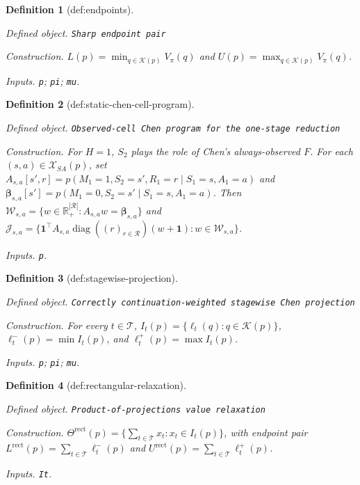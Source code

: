 \documentclass{article}
\newtheorem{definition}{Definition}
\begin{document}
\begin{definition}[def:endpoints]\label{def:endpoints}
\par\smallskip\noindent\emph{Defined object.} \texttt{Sharp endpoint pair}
\par\smallskip\noindent\emph{Construction.} \(L(p)=\min_{q\in\mathcal K(p)}V_\pi(q)\) and \(U(p)=\max_{q\in\mathcal K(p)}V_\pi(q)\).
\par\smallskip\noindent\emph{Inputs.} \texttt{p}; \texttt{pi}; \texttt{mu}.
\end{definition}

\begin{definition}[def:static-chen-cell-program]\label{def:static-chen-cell-program}
\par\smallskip\noindent\emph{Defined object.} \texttt{Observed-\allowbreak{}cell Chen program for the one-\allowbreak{}stage reduction}
\par\smallskip\noindent\emph{Construction.} For \(H=1\), \(S_2\) plays the role of Chen's always-observed \(F\). For each \((s,a)\in\mathcal X_{SA}(p)\), set \(A_{s,a}[s',r]=p(M_1=1,S_2=s',R_1=r\mid S_1=s,A_1=a)\) and \(\boldsymbol\beta_{s,a}[s']=p(M_1=0,S_2=s'\mid S_1=s,A_1=a)\). Then \(\mathcal W_{s,a}=\{w\in\mathbb R_+^{|\mathcal R|}:A_{s,a}w=\boldsymbol\beta_{s,a}\}\) and \(\mathcal J_{s,a}=\{\mathbf 1^\top A_{s,a}\operatorname{diag}((r)_{r\in\mathcal R})(w+\mathbf 1):w\in\mathcal W_{s,a}\}\).
\par\smallskip\noindent\emph{Inputs.} \texttt{p}.
\end{definition}

\begin{definition}[def:stagewise-projection]\label{def:stagewise-projection}
\par\smallskip\noindent\emph{Defined object.} \texttt{Correctly continuation-\allowbreak{}weighted stagewise Chen projection}
\par\smallskip\noindent\emph{Construction.} For every \(t\in\mathcal T\), \(I_t(p)=\{\ell_t(q):q\in\mathcal K(p)\}\), \(\ell_t^-(p)=\min I_t(p)\), and \(\ell_t^+(p)=\max I_t(p)\).
\par\smallskip\noindent\emph{Inputs.} \texttt{p}; \texttt{pi}; \texttt{mu}.
\end{definition}

\begin{definition}[def:rectangular-relaxation]\label{def:rectangular-relaxation}
\par\smallskip\noindent\emph{Defined object.} \texttt{Product-\allowbreak{}of-\allowbreak{}projections value relaxation}
\par\smallskip\noindent\emph{Construction.} \(\Theta^{\mathrm{rect}}(p)=\{\sum_{t\in\mathcal T}x_t:x_t\in I_t(p)\}\), with endpoint pair \(L^{\mathrm{rect}}(p)=\sum_{t\in\mathcal T}\ell_t^-(p)\) and \(U^{\mathrm{rect}}(p)=\sum_{t\in\mathcal T}\ell_t^+(p)\).
\par\smallskip\noindent\emph{Inputs.} \texttt{It}.
\end{definition}
\end{document}
